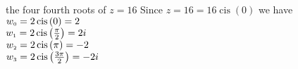 { the four fourth roots of $z=16$}
{ Since $z=16 = 16\operatorname{cis}\left(0 \right)$ we have \\$w_{\text{\tiny$0$}} =2\operatorname{cis}\left(0\right) =2$\\$w_{\text{\tiny$1$}} = 2\operatorname{cis}\left(\frac{\pi}{2}\right) = 2i$\\ $w_{\text{\tiny$2$}} = 2\operatorname{cis}\left(\pi\right) = -2$\\ $w_{\text{\tiny$3$}} = 2\operatorname{cis}\left(\frac{3\pi}{2}\right) = -2i$}
